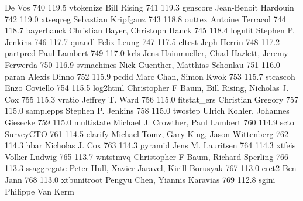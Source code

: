                                    De Vos                                  
   740    119.5    vtokenize     Bill Rising                             
   741    119.3    genscore      Jean-Benoit Hardouin                    
   742    119.0    xtseqreg      Sebastian Kripfganz                     
   743    118.8    outtex        Antoine Terracol                        
   744    118.7    bayerhanck    Christian Bayer, Christoph Hanck        
   745    118.4    lognfit       Stephen P. Jenkins                      
   746    117.7    quandl        Felix Leung                             
   747    117.5    cltest        Jeph Herrin                             
   748    117.2    partpred      Paul Lambert                            
   749    117.0    krls          Jens Hainmueller, Chad Hazlett, Jeremy  
                                   Ferwerda                                
   750    116.9    svmachines    Nick Guenther, Matthias Schonlau        
   751    116.0    paran         Alexis Dinno                            
   752    115.9    pcdid         Marc Chan, Simon Kwok                   
   753    115.7    stcascoh      Enzo Coviello                           
   754    115.5    log2html      Christopher F Baum, Bill Rising,        
                                   Nicholas J. Cox                         
   755    115.3    vratio        Jeffrey T. Ward                         
   756    115.0    fitstat_ers   Christian Gregory                       
   757    115.0    samplepps     Stephen P. Jenkins                      
   758    115.0    twostep       Ulrich Kohler, Johannes Giesecke        
   759    115.0    multistate    Michael J. Crowther, Paul Lambert       
   760    114.9    scto          SurveyCTO                               
   761    114.5    clarify       Michael Tomz, Gary King, Jason          
                                   Wittenberg                              
   762    114.3    hbar          Nicholas J. Cox                         
   763    114.3    pyramid       Jens M. Lauritsen                       
   764    114.3    xtfeis        Volker Ludwig                           
   765    113.7    wntstmvq      Christopher F Baum, Richard Sperling    
   766    113.3    ssaggregate   Peter Hull, Xavier Jaravel, Kirill      
                                   Borusyak                                
   767    113.0    eret2         Ben Jann                                
   768    113.0    xtbunitroot   Pengyu Chen, Yiannis Karavias           
   769    112.8    sgini         Philippe Van Kerm                       
